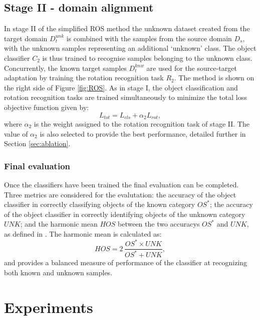 \documentclass[10pt,twocolumn,letterpaper]{article}
\begin{document}
\subsection{Stage II - domain alignment}

In stage II of the simplified ROS method the unknown dataset created from the target domain $D_t^{unk}$ is combined with the samples from the source domain $D_s$, with the unknown samples representing an additional `unknown' class. The object classifier $C_2$ is thus trained to recognise samples belonging to the unknown class. Concurrently, the known target samples  $D^{knw}_t$ are used for the source-target adaptation by training the rotation recognition task $R_2$. The method is shown on the right side of Figure \ref{fig:ROS}. As in stage I, the object classification and rotation recognition tasks are trained simultaneously to minimize the total loss objective function given by:
\begin{equation}
  L_{tot} = L_{cls} + \alpha_2 L_{rot} ,
  \label{eq:totalloss}
\end{equation}
where $\alpha_2$ is the weight assigned to the rotation recognition task of stage II. The value of $\alpha_2$ is also selected to provide the best performance, detailed further in Section \ref{sec:ablation}. 


\subsubsection*{Final evaluation}

Once the classifiers have been trained the final evaluation can be completed. Three metrics are considered for the evalutation: the accuracy of the object classifier in correctly classifying objects of the known category $OS^*$; the accuracy of the object classifier in correctly identifying objects of the unknown category $UNK$; and the harmonic mean $HOS$ between the two accuracys $OS^*$ and $UNK$, as defined in \cite{Bucci2020}. The harmonic mean is calculated as:
\begin{equation}
 HOS = 2\, \frac{OS^* \times UNK}{OS^* + UNK} ,
 \label{eq:hos}
\end{equation}
and provides a balanced measure of performance of the classifier at recognizing both known and unknown samples.


\section{Experiments}
\label{sec:experiments}
\end{document}
